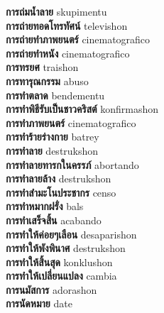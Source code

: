 \textbf{ การถ่มน้ำลาย  } skupimentu \\
\textbf{ การถ่ายทอดโทรทัศน์  } televishon \\
\textbf{ การถ่ายทำภาพยนตร์  } cinematografico \\
\textbf{ การถ่ายทำหนัง  } cinematografico \\
\textbf{ การทรยศ  } traishon \\
\textbf{ การทารุณกรรม  } abuso \\
\textbf{ การทำตลาด  } bendementu \\
\textbf{ การทำพิธีรับเป็นชาวคริสต์  } konfirmashon \\
\textbf{ การทำภาพยนตร์  } cinematografico \\
\textbf{ การทำร้ายร่างกาย  } batrey \\
\textbf{ การทำลาย  } destrukshon \\
\textbf{ การทำลายทารกในครรภ์  } abortando \\
\textbf{ การทำลายล้าง  } destrukshon \\
\textbf{ การทำสำมะโนประชากร  } censo \\
\textbf{ การทำหมากฝรั่ง  } bals \\
\textbf{ การทำเสร็จสิ้น  } acabando \\
\textbf{ การทำให้ค่อยๆเลือน  } desaparishon \\
\textbf{ การทำให้พังพินาศ  } destrukshon \\
\textbf{ การทำให้สิ้นสุด  } konklushon \\
\textbf{ การทำให้เปลี่ยนแปลง  } cambia \\
\textbf{ การนมัสการ  } adorashon \\
\textbf{ การนัดหมาย  } date \\
